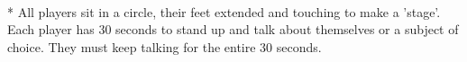 \begin{minipage}{\textwidth}
\equip{}
\\*
All players sit in a circle, their feet extended and touching to make a 'stage'.  Each player has 30 seconds to stand up and talk about themselves or a subject of choice.  They must keep talking for the entire 30 seconds.
\end{minipage}    \vfill

